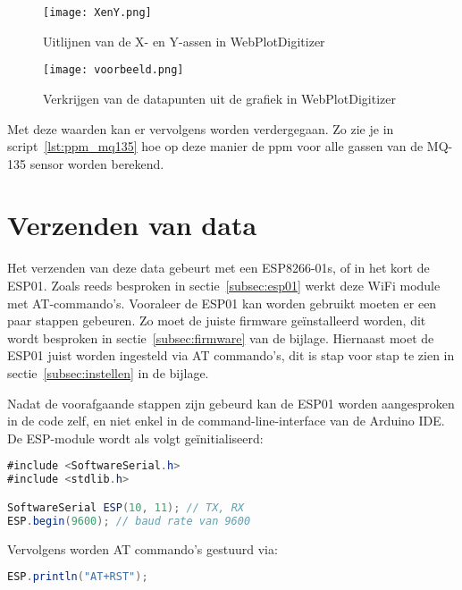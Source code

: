 \begin{figure}[h]
    \texttt{[image: XenY.png]}
    \caption[Uitlijnen X- en Y-assen]{Uitlijnen van de X- en Y-assen in WebPlotDigitizer}
    \label{fig:x_en_y}
\end{figure}

\begin{figure}[h]
    \texttt{[image: voorbeeld.png]}
    \caption[Datapunten uit WebPlotDigitizer]{Verkrijgen van de datapunten uit de grafiek in WebPlotDigitizer}
    \label{fig:voorbeeld}
\end{figure}

Met deze waarden kan er vervolgens worden verdergegaan. Zo zie je in script~\ref{lst:ppm_mq135} hoe op deze manier de ppm voor alle gassen van de MQ-135 sensor worden berekend.

\pagebreak

\section{Verzenden van data}%
\label{sec:verzendendata}

Het verzenden van deze data gebeurt met een ESP8266-01s, of in het kort de ESP01. Zoals reeds besproken in sectie~\ref{subsec:esp01} werkt deze WiFi module met AT-commando's. Vooraleer de ESP01 kan worden gebruikt moeten er een paar stappen gebeuren. Zo moet de juiste firmware geïnstalleerd worden, dit wordt besproken in sectie~\ref{subsec:firmware} van de bijlage. Hiernaast moet de ESP01 juist worden ingesteld via AT commando's, dit is stap voor stap te zien in sectie~\ref{subsec:instellen} in de bijlage.

Nadat de voorafgaande stappen zijn gebeurd kan de ESP01 worden aangesproken in de code zelf, en niet enkel in de command-line-interface van de Arduino IDE. De ESP-module wordt als volgt geïnitialiseerd:
\begin{lstlisting}[language=Java, caption={Initialisatie van de ESP in Arduino}]
#include <SoftwareSerial.h>
#include <stdlib.h>

SoftwareSerial ESP(10, 11); // TX, RX
ESP.begin(9600); // baud rate van 9600
\end{lstlisting}

Vervolgens worden AT commando's gestuurd via:
\begin{lstlisting}[language=Java, caption={Voorbeeld: resetten van de ESP}]
ESP.println("AT+RST");
\end{lstlisting}

